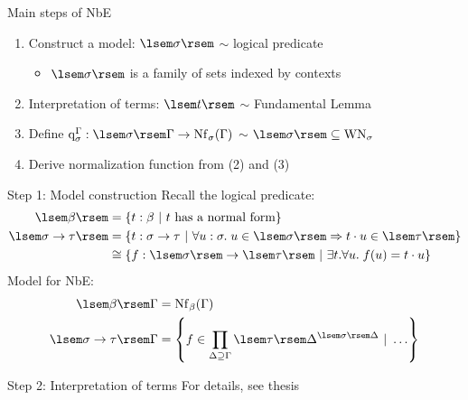 \documentclass{beamer}
\begin{document}
\begin{frame}{Main steps of NbE}
\begin{enumerate}
    \item Construct a model: $\sem{\sigma}$ $\sim$ logical predicate
    \begin{itemize}
        \item $\sem{\sigma}$ is a family of sets indexed by contexts
    \end{itemize}
    \item Interpretation of terms: $\sem{t}$ $\sim$ Fundamental Lemma
    \item Define $\quotef{\Gamma}{\sigma} : \sem{\sigma} \Gamma \to \cNf{\Gamma}{\sigma}$ $\sim$ $\sem{\sigma} \subs \mathrm{WN}_\sigma$
    \item Derive normalization function from (2) and (3)
\end{enumerate}
\end{frame}

\begin{frame}{Step 1: Model construction}
Recall the logical predicate:
\begin{align*}
\sem{\beta}
    &= \setof{\typedtm{t}{\beta}}{t\text{ has a normal form}} \\
\sem{\functy{\sigma}{\tau}}
    &= \setof{\typedtm{t}{\functy{\sigma}{\tau}}}{\forall \typedtm{u}{\sigma}.\;u \in \sem{\sigma} \implies \app{t}{u} \in \sem{\tau}} \\
    &\cong \setof{f : \sem{\sigma} \to \sem{\tau}}{\exists t.\forall u.\;f(u) = \app{t}{u}}
\end{align*}
Model for NbE:
\begin{align*}
\sem{\beta} \Gamma &= \cNf{\Gamma}{\beta} \\
\sem{\functy{\sigma}{\tau}} \Gamma &= \setof{f \in \prod_{\Delta \sups \Gamma}{\funcset{\sem{\sigma} \Delta}{\sem{\tau} \Delta}}}{\ldots}
\end{align*}
\end{frame}

\begin{frame}{Step 2: Interpretation of terms}
For details, see thesis
\end{frame}
\end{document}
